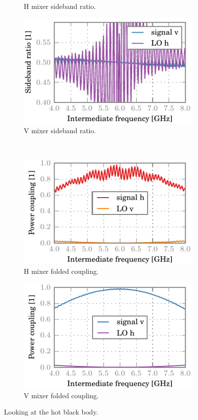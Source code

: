 \begin{figure}[hbtp]
\begin{subfigure}[b]{.5\textwidth}
        \caption{H mixer sideband ratio.}
    \end{subfigure}%
    \begin{subfigure}[b]{.5\textwidth}
        \includegraphics{chapter_3/14_hbb_v_sbr}%
        \caption{V mixer sideband ratio.}
    \end{subfigure}%
    \\
    \begin{subfigure}[b]{.5\textwidth}
        \includegraphics{chapter_3/14_hbb_h_ssb}%
        \caption{H mixer folded coupling.}
    \end{subfigure}%
    \begin{subfigure}[b]{.5\textwidth}
        \includegraphics{chapter_3/14_hbb_v_ssb}%
        \caption{V mixer folded coupling.}
    \end{subfigure}%
    \caption{Looking at the hot black body.}
    \label{fig:14_hbb}
\end{figure}

